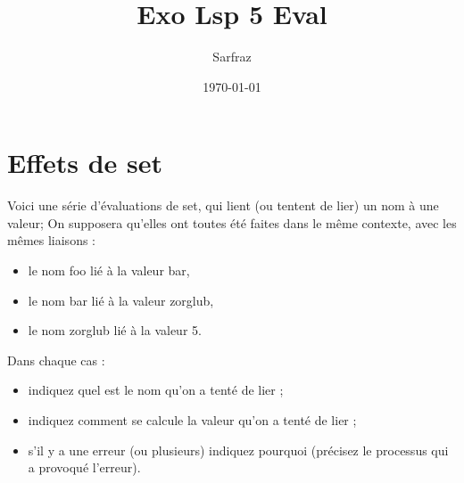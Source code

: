 \documentclass[a4paper, 11pt]{article}
\title{Exo Lsp 5 Eval }
\author{Sarfraz \bsc{kapasi}}
\date{\today}
\begin{document}
%
\maketitle
%
\section{Effets de set}
Voici une série d'évaluations de set, qui lient (ou tentent de lier) un nom à une valeur;
On supposera qu'elles ont toutes été faites dans le même contexte, avec les mêmes liaisons :
\begin{itemize}
    \item le nom foo lié à la valeur bar,
    \item le nom bar lié à la valeur zorglub,
    \item le nom zorglub lié à la valeur 5.
\end{itemize}
Dans chaque cas :
\begin{itemize}
    \item indiquez quel est le nom qu'on a tenté de lier ;
    \item indiquez comment se calcule la valeur qu'on a tenté de lier ;
    \item s'il y a une erreur (ou plusieurs) indiquez pourquoi (précisez le processus qui a provoqué l'erreur).
\end{itemize}
\end{document}
